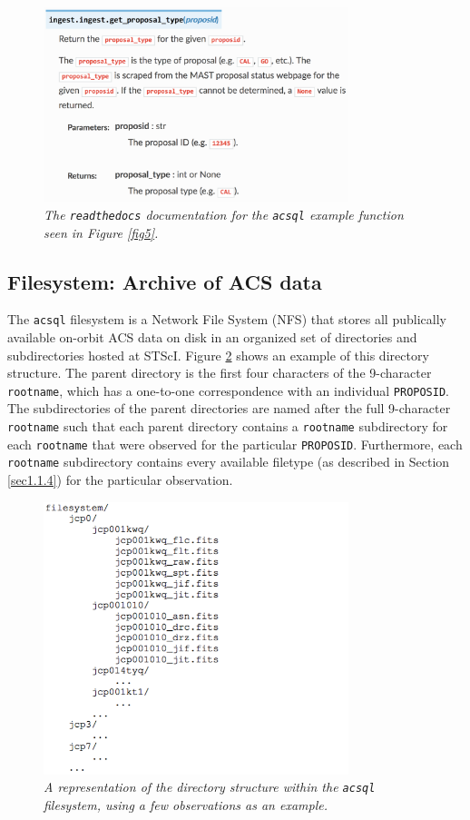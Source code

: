\documentclass[10pt,journal,compsoc]{IEEEtran}
\begin{document}
\begin{figure}[!t]
\centering
\includegraphics[width=3.5in]{./figures/readthedocs.png}
\caption{\textit{The \texttt{readthedocs} documentation for the \texttt{acsql} example function seen in Figure \ref{fig5}.}}
\label{fig6}
\end{figure}


\subsection{Filesystem: Archive of ACS data} \label{sec3.3}

The \texttt{acsql} filesystem is a Network File System (NFS) that stores all publically available on-orbit ACS data on disk in an organized set of directories and subdirectories hosted at STScI.
Figure \ref{fig7} shows an example of this directory structure.  The parent directory is the first four characters of the 9-character \texttt{rootname}, which has a one-to-one
correspondence with an individual \texttt{PROPOSID}. The subdirectories of the parent directories are named after the full 9-character \texttt{rootname} such that each parent directory
contains a \texttt{rootname} subdirectory for each \texttt{rootname} that were observed for the particular \texttt{PROPOSID}.  Furthermore, each \texttt{rootname} subdirectory contains
every available filetype (as described in Section \ref{sec1.1.4}) for the particular observation.

\begin{figure}[!h]
\centering
\includegraphics[width=3.5in]{./figures/filesystem_structure_listings.png}
\caption{\textit{A representation of the directory structure within the \texttt{acsql} filesystem, using a few observations as an example.}}
\label{fig7}
\end{figure}
\end{document}
